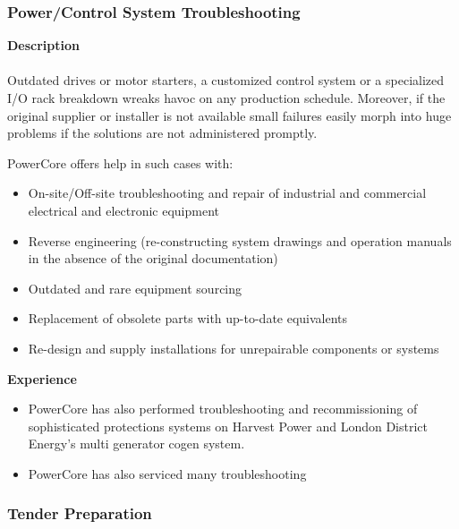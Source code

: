 \subsubsection{Power/Control System Troubleshooting }
\label{Sub:Exp:SR}

\textbf{Description}\\
\\
Outdated drives or motor starters, a customized control system or a specialized I/O rack breakdown wreaks havoc on any production schedule. Moreover, if the original supplier or installer is not available small failures easily morph into huge problems if the solutions are not administered promptly. 

PowerCore offers help in such cases with: 
\begin{itemize}
	\item On-site/Off-site troubleshooting and repair of industrial and commercial electrical and electronic equipment
	\item Reverse engineering (re-constructing system drawings and operation manuals in the absence of the original documentation)
	\item Outdated and rare equipment sourcing
	\item Replacement of obsolete parts with up-to-date equivalents
	\item Re-design and supply installations for unrepairable components or systems
\end{itemize}

\textbf{Experience}\\
\begin{itemize}
	\item PowerCore has also performed troubleshooting and recommissioning of sophisticated protections systems on Harvest Power and London District Energy's multi generator cogen system.
	\item PowerCore has also serviced many  troubleshooting
\end{itemize}

\subsubsection{Tender Preparation}
\label{Sub:Exp:TP}

